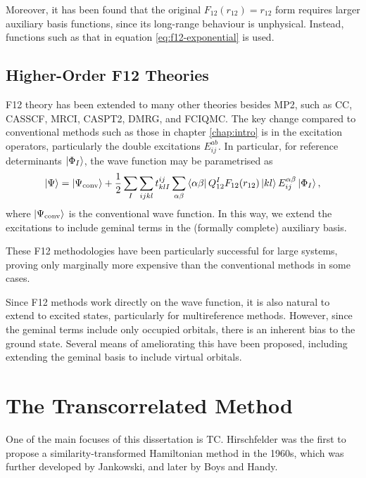 Moreover, it has been found that the original $F_{12}(r_{12})=r_{12}$ form requires larger auxiliary basis functions, since its long-range behaviour is unphysical. Instead, functions such as that in equation \ref{eq:f12-exponential} is used.

\subsection{Higher-Order F12 Theories}

F12 theory has been extended to many other theories besides MP2, such as \gls{CC}, \gls{CASSCF}, \gls{MRCI}, \gls{CASPT2}, \gls{DMRG}, and \gls{FCIQMC}. The key change compared to conventional methods such as those in chapter \ref{chap:intro} is in the excitation operators, particularly the double excitations $E_{ij}^{ab}$. In particular, for reference determinants $\ket{\Phi_I}$, the wave function may be parametrised as
\begin{equation}
    \ket\Psi = \ket{\Psi_\text{conv}} + \frac 12\sum_{I}\sum_{ijkl}t^{ij}_{klI}\sum_{\alpha\beta}\bra{\alpha\beta}Q_{12}^IF_{12}(r_{12})\ket{kl}E_{ij}^{\alpha\beta}\ket{\Phi_I},
\end{equation}
where $\ket{\Psi_\text{conv}}$ is the conventional wave function. In this way, we extend the excitations to include geminal terms in the (formally complete) auxiliary basis.

These F12 methodologies have been particularly successful for large systems, proving only marginally more expensive than the conventional methods in some cases.

Since F12 methods work directly on the wave function, it is also natural to extend to excited states, particularly for multireference methods. However, since the geminal terms include only occupied orbitals, there is an inherent bias to the ground state. Several means of ameliorating this have been proposed, including extending the geminal basis to include virtual orbitals.

\section{The Transcorrelated Method}
\label{sec:tc}

One of the main focuses of this dissertation is \gls{TC}. Hirschfelder was the first to propose a similarity-transformed Hamiltonian method in the 1960s,\cite{hirschfelderRemoval1963} which was further developed by Jankowski, and later by Boys and Handy.

